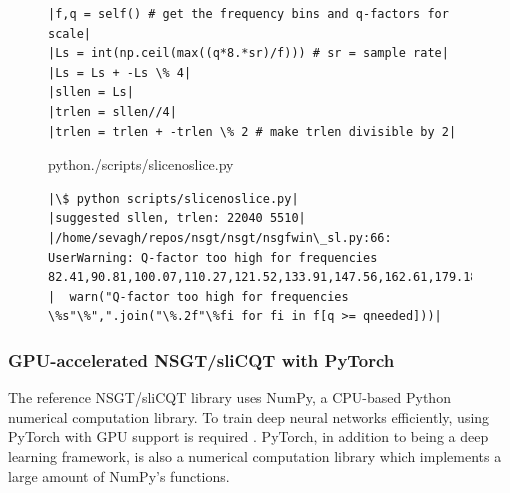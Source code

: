\documentclass[report.tex]{subfiles}
\begin{document}
\begin{figure}[h]
  \centering
\begin{minipage}{\textwidth}
\begin{verbatim}
|f,q = self() # get the frequency bins and q-factors for scale|
|Ls = int(np.ceil(max((q*8.*sr)/f))) # sr = sample rate|
|Ls = Ls + -Ls \% 4|
|sllen = Ls|
|trlen = sllen//4|
|trlen = trlen + -trlen \% 2 # make trlen divisible by 2|
\end{verbatim}
\vspace{1em}
\end{minipage}
 \begin{minipage}{\textwidth}
  \centering
\setlength\partopsep{-\topsep}
\begin{inputminted}[linenos,breaklines,frame=single,fontsize=\scriptsize]{python}{./scripts/slicenoslice.py}
\end{inputminted}
 \vspace{1em}
 \end{minipage}
 \begin{minipage}{\textwidth}
  \centering
\begin{verbatim}
|\$ python scripts/slicenoslice.py|
|suggested sllen, trlen: 22040 5510|
|/home/sevagh/repos/nsgt/nsgt/nsgfwin\_sl.py:66: UserWarning: Q-factor too high for frequencies 82.41,90.81,100.07,110.27,121.52,133.91,147.56,162.61,179.18,...|
|  warn("Q-factor too high for frequencies \%s"\%",".join("\%.2f"\%fi for fi in f[q >= qneeded]))|
\end{verbatim}
 \end{minipage}
  \label{code:slicenoslice}
\end{figure}

\subsubsection{GPU-accelerated NSGT/sliCQT with PyTorch}
\label{sec:torchslicq}

The reference NSGT/sliCQT library uses NumPy, a CPU-based Python numerical computation library. To train deep neural networks efficiently, using PyTorch with GPU support is required \parencite{pytorch}. PyTorch, in addition to being a deep learning framework, is also a numerical computation library which implements a large amount of NumPy's functions.
\end{document}
